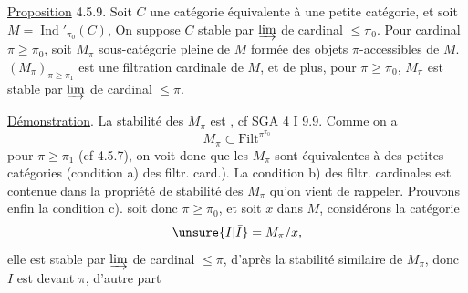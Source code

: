 \uline{Proposition} 4.5.9. Soit $C$ une catégorie équivalente à une petite catégorie, et soit $M=\operatorname{Ind}'_{\pi_0}(C)$,  On suppose  $C$ stable par $\varinjlim$ de cardinal $\leq\pi_0$. Pour  cardinal $\pi\geq\pi_0$, soit $M_\pi$  sous-catégorie pleine de $M$ formée des objets $\pi$-accessibles de $M$.   $(M_\pi)_{\pi\geq\pi_1}$ est une filtration cardinale de $M$, et de plus, pour $\pi\geq\pi_0$, $M_\pi$ est stable  par $\varinjlim$ de cardinal $\leq\pi$.


\uline{Démonstration}. La stabilité des $M_\pi$ est , cf SGA 4 I 9.9. Comme  on a
\[
M_\pi\subset\mathrm{Filt}^{\pi^{\pi_0}}
\]
pour $\pi\geq\pi_1$ (cf 4.5.7), on voit donc que les $M_\pi$ sont équivalentes à des petites catégories (condition a) des filtr. card.). La condition b) des filtr. cardinales est contenue dans la propriété de stabilité des $M_\pi$ qu'on vient de rappeler. Prouvons enfin la condition c).  soit donc $\pi\geq\pi_0$, et soit $x$ dans $M$, considérons la catégorie
\[
\unsure{I|\bar I}=M_\pi/x,
\]
elle est stable par $\varinjlim$ de cardinal $\leq\pi$, d'après la stabilité similaire de $M_\pi$, donc $I$ est  devant $\pi$,  d'autre part 

